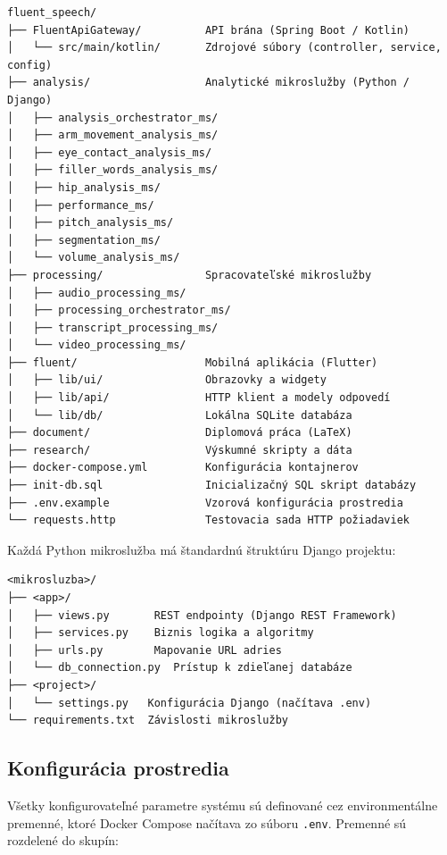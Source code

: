 \begin{verbatim}
fluent_speech/
├── FluentApiGateway/          API brána (Spring Boot / Kotlin)
│   └── src/main/kotlin/       Zdrojové súbory (controller, service, config)
├── analysis/                  Analytické mikroslužby (Python / Django)
│   ├── analysis_orchestrator_ms/
│   ├── arm_movement_analysis_ms/
│   ├── eye_contact_analysis_ms/
│   ├── filler_words_analysis_ms/
│   ├── hip_analysis_ms/
│   ├── performance_ms/
│   ├── pitch_analysis_ms/
│   ├── segmentation_ms/
│   └── volume_analysis_ms/
├── processing/                Spracovateľské mikroslužby
│   ├── audio_processing_ms/
│   ├── processing_orchestrator_ms/
│   ├── transcript_processing_ms/
│   └── video_processing_ms/
├── fluent/                    Mobilná aplikácia (Flutter)
│   ├── lib/ui/                Obrazovky a widgety
│   ├── lib/api/               HTTP klient a modely odpovedí
│   └── lib/db/                Lokálna SQLite databáza
├── document/                  Diplomová práca (LaTeX)
├── research/                  Výskumné skripty a dáta
├── docker-compose.yml         Konfigurácia kontajnerov
├── init-db.sql                Inicializačný SQL skript databázy
├── .env.example               Vzorová konfigurácia prostredia
└── requests.http              Testovacia sada HTTP požiadaviek
\end{verbatim}

Každá Python mikroslužba má štandardnú štruktúru Django projektu:
\begin{verbatim}
<mikrosluzba>/
├── <app>/
│   ├── views.py       REST endpointy (Django REST Framework)
│   ├── services.py    Biznis logika a algoritmy
│   ├── urls.py        Mapovanie URL adries
│   └── db_connection.py  Prístup k zdieľanej databáze
├── <project>/
│   └── settings.py   Konfigurácia Django (načítava .env)
└── requirements.txt  Závislosti mikroslužby
\end{verbatim}

\subsection{Konfigurácia prostredia}

Všetky konfigurovateľné parametre systému sú definované cez environmentálne premenné, ktoré Docker Compose načítava zo súboru \texttt{.env}. Premenné sú rozdelené do skupín:

